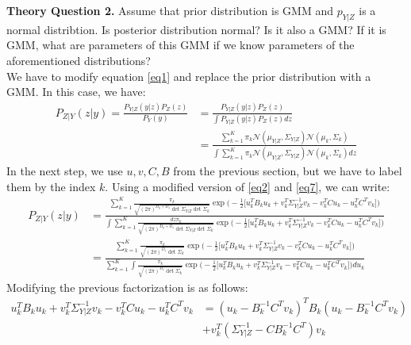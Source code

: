 \documentclass[11pt,a4paper]{article}
\begin{document}
	\color{blue}
	\large{\textbf{Theory Question 2.}} Assume that prior distribution is GMM and $p_{Y|Z}$ is a normal distribtion.
Is posterior distribution normal? Is it also a GMM? If it is GMM, what are parameters of this
GMM if we know parameters of the aforementioned distributions?
	\color{black}
	\\
	We have to modify equation \eqref{eq1} and replace the prior distribution with a GMM. In this case, we have:
\begin{equation} 
\begin{split}
P_{Z|Y}(z|y)=\frac{P_{Y|Z}(y|z)P_Z(z)}{P_Y(y)}&=\frac{P_{Y|Z}(y|z)P_Z(z)}{\int P_{Y|Z}(y|z)P_Z(z) dz}\\
&=\frac{ \sum_{k=1}^K \pi_k\mathcal{N}(\mu_{Y|Z},\Sigma_{Y|Z})\mathcal{N}(\mu_k,\Sigma_k) } {\int\sum_{k=1}^K \pi_k\mathcal{N}(\mu_{Y|Z},\Sigma_{Y|Z})\mathcal{N}(\mu_k,\Sigma_k) dz}
\end{split}
\end{equation}
In the next step, we use $u,v,C,B$ from the previous section, but we have to label them by the index $k$. Using a modified version of \eqref{eq2} and \eqref{eq7}, we can write:
\begin{equation} 
\begin{split}
P_{Z|Y}(z|y)&=\frac{ \sum_{k=1}^K \frac{\pi_k}{\sqrt{(2\pi)^{D_y+D_z}\det \Sigma_{Y|Z} \det \Sigma_k}} \exp \Big(-\frac{1}{2}\big[u_k^TB_ku_k+v_k^T\Sigma_{Y|Z}^{-1}v_k-v_k^TCu_k-u_k^TC^Tv_k\big]\Big) } {\int\sum_{k=1}^K \frac{dz\pi_k}{\sqrt{(2\pi)^{D_y+D_z}\det \Sigma_{Y|Z} \det \Sigma_k}} \exp \Big(-\frac{1}{2}\big[u_k^TB_ku_k+v_k^T\Sigma_{Y|Z}^{-1}v_k-v_k^TCu_k-u_k^TC^Tv_k\big]\Big) }\\
&=\frac{ \sum_{k=1}^K \frac{\pi_k}{\sqrt{(2\pi)^{D_z} \det \Sigma_k}} \exp \Big(-\frac{1}{2}\big[u_k^TB_ku_k+v_k^T\Sigma_{Y|Z}^{-1}v_k-v_k^TCu_k-u_k^TC^Tv_k\big]\Big) } {\sum_{k=1}^K \int\frac{\pi_k}{\sqrt{(2\pi)^{D_z} \det \Sigma_k}} \exp \Big(-\frac{1}{2}\big[u_k^TB_ku_k+v_k^T\Sigma_{Y|Z}^{-1}v_k-v_k^TCu_k-u_k^TC^Tv_k\big]\Big) du_k}
\end{split}
\end{equation}
Modifying the previous factorization is as follows:
\begin{equation} 
\begin{split}
u_k^TB_ku_k+v_k^T\Sigma_{Y|Z}^{-1}v_k-v_k^TCu_k-u_k^TC^Tv_k&=(u_k-B_k^{-1}C^Tv_k)^TB_k(u_k-B_k^{-1}C^Tv_k)\\&+v_k^T(\Sigma_{Y|Z}^{-1}-CB_k^{-1}C^T)v_k
\end{split}
\end{equation}
\end{document}
